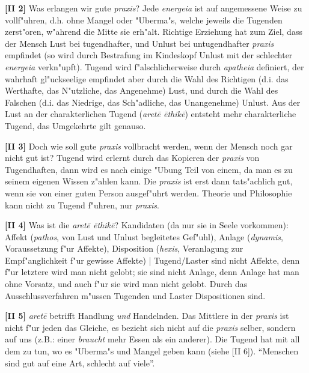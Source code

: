 \documentclass[emulatestandardclasses]{scrartcl}
\begin{document}
\noindent \textbf{[II 2]} Was erlangen wir gute \emph{praxis}? Jede \emph{energeia} ist auf angemessene Weise zu vollf"uhren, d.h. ohne Mangel oder "Uberma"s, welche jeweils die Tugenden zerst"oren, w"ahrend die Mitte sie erh"alt. Richtige Erziehung hat zum Ziel, dass der Mensch Lust bei tugendhafter, und Unlust bei untugendhafter \emph{praxis} empfindet (so wird durch Bestrafung im Kindeskopf Unlust mit der schlechter \emph{energeia} verkn"upft). Tugend wird f"alschlicherweise durch \emph{apatheia} definiert, der wahrhaft gl"uckseelige empfindet aber durch die Wahl des Richtigen (d.i. das Werthafte, das N"utzliche, das Angenehme) Lust, und durch die Wahl des Falschen (d.i. das Niedrige, das Sch"adliche, das Unangenehme) Unlust. Aus der Lust an der charakterlichen Tugend (\emph{aret\={e} \={e}thik\={e}}) entsteht mehr charakterliche Tugend, das Umgekehrte gilt genauso.\newline

\noindent \textbf{[II 3]} Doch wie soll gute \emph{praxis} vollbracht werden, wenn der Mensch noch gar nicht gut ist? Tugend wird erlernt durch das Kopieren der \emph{praxis} von Tugendhaften, dann wird es nach einige "Ubung Teil von einem, da man es zu seinem eigenen Wissen z"ahlen kann. Die \emph{praxis} ist erst dann tats"achlich gut, wenn sie von einer guten Person ausgef"uhrt werden. Theorie und Philosophie kann nicht zu Tugend f"uhren, nur \emph{praxis}.\newline

\noindent \textbf{[II 4]} Was ist die \emph{aret\={e} \={e}thik\={e}}? Kandidaten (da nur sie in Seele vorkommen): Affekt (\emph{pathos}, von Lust und Unlust begleitetes Gef"uhl), Anlage (\emph{dynamis}, Voraussetzung f"ur Affekte), Disposition (\emph{hexis}, Veranlagung zur Empf"anglichkeit f"ur gewisse Affekte) | Tugend/Laster sind nicht Affekte, denn f"ur letztere wird man nicht gelobt; sie sind nicht Anlage, denn Anlage hat man ohne Vorsatz, und auch f"ur sie wird man nicht gelobt. Durch das Ausschlussverfahren m"ussen Tugenden und Laster Dispositionen sind. \newline

\noindent \textbf{[II 5]} \emph{aret\={e}} betrifft Handlung \emph{und} Handelnden. Das Mittlere in der \emph{praxis} ist nicht f"ur jeden das Gleiche, es bezieht sich nicht auf die \emph{praxis} selber, sondern auf uns (z.B.: einer \emph{braucht} mehr Essen als ein anderer). Die Tugend hat mit all dem zu tun, wo es "Uberma"s und Mangel geben kann (siehe [II 6]). "`Menschen sind gut auf eine Art, schlecht auf viele"'. \newline
\end{document}
